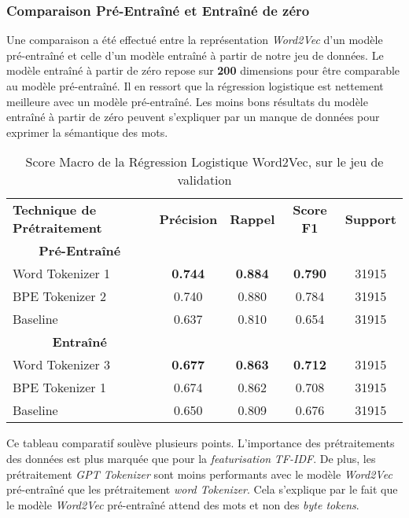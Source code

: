 \subsubsection{Comparaison Pré-Entraîné et Entraîné de zéro}
Une comparaison a été effectué entre la représentation \textit{Word2Vec} d'un modèle pré-entraîné et celle d'un modèle entraîné à partir de notre jeu de données. 
Le modèle entraîné à partir de zéro repose sur \textbf{200} dimensions pour être comparable au modèle pré-entraîné. 
Il en ressort que la régression logistique est nettement meilleure avec un modèle pré-entraîné. Les moins bons résultats du modèle entraîné à partir de zéro peuvent s'expliquer par un manque de données pour exprimer la sémantique des mots.
\begin{table}[ht]
    \centering
    \caption{Score Macro de la Régression Logistique Word2Vec, sur le jeu de validation}
    \begin{tabular}{lcccc}
    \hline
    \textbf{Technique de Prétraitement} & \textbf{Précision} & \textbf{Rappel} & \textbf{Score F1} & \textbf{Support}  \\
    \multicolumn{1}{c}{\textbf{Pré-Entraîné}} \\
    Word Tokenizer 1             & \textbf{0.744}              & \textbf{0.884}           & \textbf{0.790}            & 31915            \\
    BPE Tokenizer 2              & 0.740              & 0.880           & 0.784            & 31915            \\ \hline 
    Baseline                     & 0.637              & 0.810           & 0.654            & 31915            \\
    \hline \multicolumn{1}{c}{\textbf{Entraîné}} \\
    Word Tokenizer 3             & \textbf{0.677}              & \textbf{0.863}           & \textbf{0.712}            & 31915            \\
    BPE Tokenizer 1              & 0.674              & 0.862           & 0.708            & 31915            \\ \hline
    Baseline               & 0.650              & 0.809           & 0.676            & 31915            \\ 
    \hline \end{tabular}
    \label{tab:results}
\end{table}

Ce tableau comparatif soulève plusieurs points.
L'importance des prétraitements des données est plus marquée que pour la \textit{featurisation} \textit{TF-IDF}. 
De plus, les prétraitement \textit{GPT Tokenizer} sont moins performants avec le modèle \textit{Word2Vec} pré-entraîné que les prétraitement \textit{word Tokenizer}. 
Cela s'explique par le fait que le modèle \textit{Word2Vec} pré-entraîné attend des mots et non des \textit{byte tokens}.
